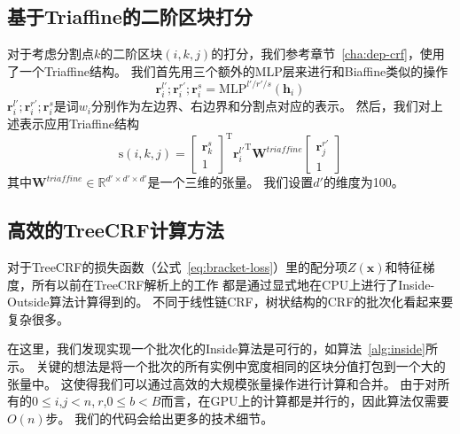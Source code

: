 \subsection{基于Triaffine的二阶区块打分}
对于考虑分割点$k$的二阶区块$(i,k,j)$的打分，我们参考章节~\ref{cha:dep-crf}，使用了一个Triaffine结构。
我们首先用三个额外的MLP层来进行和Biaffine类似的操作
\begin{equation}
	\label{con-mlp-sib}
	\mathbf{r}_i^{l'}; \mathbf{r}_i^{r'}; \mathbf{r}_i^{s} =\mathrm{MLP}^{l'/r'/s} \left( \mathbf{h}_i \right)
\end{equation}
$\mathbf{r}_i^{l'}; \mathbf{r}_i^{r'}; \mathbf{r}_i^{s}$是词$w_i$分别作为左边界、右边界和分割点对应的表示。
然后，我们对上述表示应用Triaffine结构
\begin{equation} \label{eq:con-triaffine}
	\mathrm{s}(i,k,j) =
	\left[
		\begin{array}{c}
			\mathbf{r}_{k}^{s} \\
			1                  
		\end{array}
	\right]^\mathrm{T}
	{\mathbf{r}_{i}^{l'}}^\mathrm{T}
	\mathbf{W}^\textit{triaffine}
	\left[
		\begin{array}{c}
			\mathbf{r}_{j}^{r'} \\
			1                   
		\end{array}
	\right]
\end{equation}
其中$\mathbf{W}^\textit{triaffine} \in \mathbb{R}^{d' \times d' \times d'}$是一个三维的张量。
我们设置$d'$的维度为100。



\subsection{高效的TreeCRF计算方法}

对于TreeCRF的损失函数（公式~\ref{eq:bracket-loss}）里的配分项$Z(\boldsymbol{x})$和特征梯度，所有以前在TreeCRF解析上的工作 \citep{finkel-etal-2008-efficient,durrett-klein-2015-neural}都是通过显式地在CPU上进行了Inside-Outside算法计算得到的。
不同于线性链CRF，树状结构的CRF的批次化看起来要复杂很多。

在这里，我们发现实现一个批次化的Inside算法是可行的，如算法~\ref{alg:inside}所示。
关键的想法是将一个批次的所有实例中宽度相同的区块分值打包到一个大的张量中。
这使得我们可以通过高效的大规模张量操作进行计算和合并。
由于对所有的$0 \le i$,$j<n$,$~r$,$0\le b<B$而言，在GPU上的计算都是并行的，因此算法仅需要$O(n)$步。
我们的代码会给出更多的技术细节。

